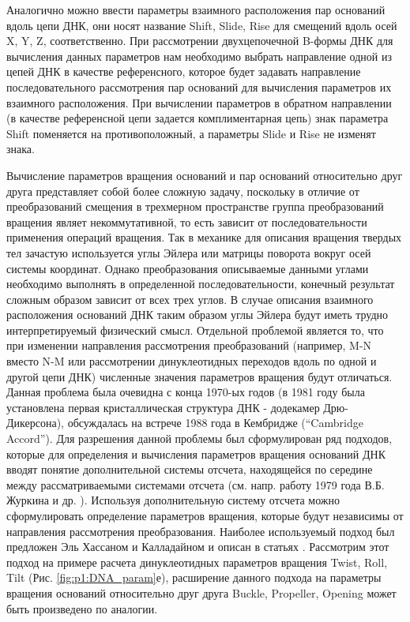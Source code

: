 Аналогично можно ввести параметры взаимного расположения пар оснований вдоль цепи ДНК, они носят название Shift, Slide, Rise для смещений вдоль осей X, Y, Z, соответственно. При рассмотрении двухцепочечной B-формы ДНК для вычисления данных параметров нам необходимо выбрать направление одной из цепей ДНК в качестве референсного, которое будет задавать направление последовательного рассмотрения пар оснований для вычисления параметров их взаимного расположения. При вычислении параметров в обратном направлении (в качестве референсной цепи задается комплиментарная цепь) знак параметра Shift поменяется на противоположный, а параметры Slide и Rise не изменят знака.

Вычисление параметров вращения оснований и пар оснований относительно друг друга представляет собой более сложную задачу, поскольку в отличие от преобразований смещения в трехмерном пространстве группа преобразований вращения являет некоммутативной, то есть зависит от последовательности применения операций вращения. Так в механике для описания вращения твердых тел зачастую используется углы Эйлера или матрицы поворота вокруг осей системы координат. Однако преобразования описываемые данными углами необходимо выполнять в определенной последовательности, конечный результат сложным образом зависит от всех трех углов. В случае описания взаимного расположения оснований ДНК таким образом углы Эйлера будут иметь трудно интерпретируемый физический смысл. Отдельной проблемой является то, что при изменении направления рассмотрения преобразований (например, M-N  вместо N-M или рассмотрении динуклеотидных переходов вдоль по одной и другой цепи ДНК) численные значения параметров вращения будут отличаться. Данная проблема была очевидна с конца 1970-ых годов (в 1981 году была установлена первая кристаллическая структура ДНК - додекамер Дрю-Дикерсона\cite{drew_structure_1981}), обсуждалась на встрече 1988 года в Кембридже (``Cambridge Accord'').  Для разрешения данной проблемы был сформулирован ряд подходов, которые для определения и вычисления параметров вращения оснований ДНК вводят понятие дополнительной системы отсчета, находящейся по середине между рассматриваемыми системами отсчета (см. напр. работу 1979 года В.Б. Журкина и др. \cite{zhurkin_anisotropic_1979}). Используя дополнительную систему отсчета можно сформулировать определение параметров вращения, которые будут независимы от направления рассмотрения преобразования.  Наиболее используемый подход был предложен Эль Хассаном и Калладайном и описан в статьях \cite{el_hassan_assessment_1995,lu_structure_1997}. Рассмотрим этот подход на примере расчета динуклеотидных параметров вращения Twist, Roll, Tilt (Рис. \ref{fig:p1:DNA_param}е), расширение данного подхода на параметры вращения оснований относительно друг друга Buckle, Propeller, Opening может быть произведено по аналогии. 

